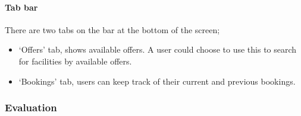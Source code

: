 \paragraph{Tab bar}

There are two tabs on the bar at the bottom of the screen;
\begin{itemize}
	\item `Offers' tab, shows available offers. A user could choose to use
		this to search for facilities by available offers.
	\item `Bookings' tab, users can keep track of their current and previous
		bookings.
\end{itemize}


\fullwidth%
\subsubsection{Evaluation}

